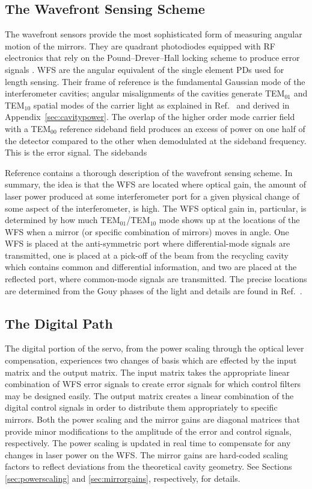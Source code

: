 \subsection{The Wavefront Sensing Scheme}
\label{sec:WFSsensing}
The wavefront sensors provide the most sophisticated form of measuring angular motion of the mirrors. They are quadrant photodiodes equipped with RF electronics that rely on the Pound--Drever--Hall locking scheme to produce error signals \cite{Sigg1996Wavefront}. WFS are the angular equivalent of the single element PDs used for length sensing. Their frame of reference is the fundamental Gaussian mode of the interferometer cavities; angular misalignments of the cavities generate TEM$_{01}$ and TEM$_{10}$ spatial modes of the carrier light as explained in Ref.~\cite{Anderson1984Alignment} and derived in Appendix~\ref{sec:cavitypower}. The overlap of the higher order mode carrier field with a TEM$_{00}$ reference sideband field produces an excess of power on one half of the detector compared to the other when demodulated at the sideband frequency. This is the error signal. The sidebands

Reference \cite{Fritschel1998Alignment} contains a thorough description of the wavefront sensing scheme. In summary, the idea is that the WFS are located where optical gain, the amount of laser power produced at some interferometer port for a given physical change of some aspect of the interferometer, is high. The WFS optical gain in, particular, is determined by how much TEM$_{01}$/TEM$_{10}$ mode shows up at the locations of the WFS when a mirror (or specific combination of mirrors) moves in angle. One WFS is placed at the anti-symmetric port where differential-mode signals are transmitted, one is placed at a pick-off of the beam from the recycling cavity which contains common and differential information, and two are placed at the reflected port, where common-mode signals are transmitted. The precise locations are determined from the Gouy phases of the light and details are found in Ref.~\cite{Barsotti2009Modeling}.



\subsection{The Digital Path}
The digital portion of the servo, from the power scaling through the optical lever compensation, experiences two changes of basis which are effected by the input matrix and the output matrix. The input matrix takes the appropriate linear combination of WFS error signals to create error signals for which control filters may be designed easily. The output matrix creates a linear combination of the digital control signals in order to distribute them appropriately to specific mirrors. Both the power scaling and the mirror gains are diagonal matrices that provide minor modifications to the amplitude of the error and control signals, respectively. The power scaling is updated in real time to compensate for any changes in laser power on the WFS. The mirror gains are hard-coded scaling factors to reflect deviations from the theoretical cavity geometry. See Sections \ref{sec:powerscaling} and \ref{sec:mirrorgains}, respectively, for details.



